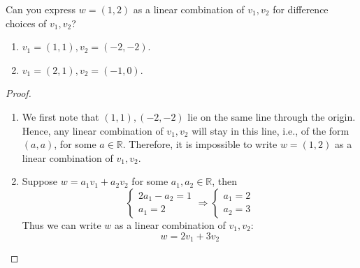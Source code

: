 \documentclass[openany]{book}
\newcommand{\R}{\mathbb{R}}
\begin{document}
\begin{prob}
    Can you express $w=(1,2)$ as a linear combination of $v_1,v_2$ for difference choices of $v_1,v_2$?
    \begin{enumerate}
        \item $v_1=(1,1), v_2=(-2,-2)$.
        \item $v_1=(2,1), v_2=(-1, 0)$.
    \end{enumerate}
\end{prob}
\begin{proof}
    \begin{enumerate}
        \item We first note that $(1,1), (-2,-2)$ lie on the same line through the origin. Hence, any linear combination of $v_1,v_2$ will stay in this line, i.e., of the form $(a,a)$, for some $a\in\R$. Therefore, it is impossible to write $w=(1,2)$ as a linear combination of $v_1,v_2$.
        \item Suppose $w=a_1v_1+a_2v_2$ for some $a_1,a_2\in\R$, then 
        \begin{equation*}
            \begin{cases}
                2a_1-a_2=1\\
                a_1=2
            \end{cases}\Rightarrow \begin{cases}
                a_1=2\\
                a_2=3
            \end{cases}
        \end{equation*}
        Thus we can write $w$ as a linear combination of $v_1,v_2$:
        \begin{equation*}
            w=2v_1+3v_2
        \end{equation*}
    \end{enumerate}
\end{proof}
\end{document}
